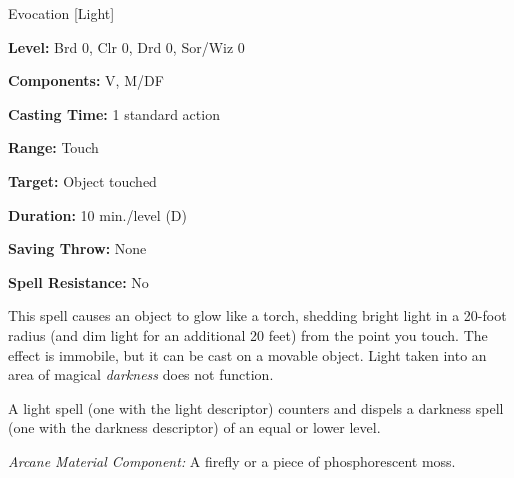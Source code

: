 
Evocation [Light]

\textbf{Level:} Brd 0, Clr 0, Drd 0, Sor/Wiz 0

\textbf{Components:} V, M/DF

\textbf{Casting Time:} 1 standard action

\textbf{Range:} Touch

\textbf{Target:} Object touched

\textbf{Duration:} 10 min./level (D)

\textbf{Saving Throw:} None

\textbf{Spell Resistance:} No

This spell causes an object to glow like a torch, shedding bright light in a 20-foot 
radius (and dim light for an additional 20 feet) from the point you touch. The 
effect is immobile, but it can be cast on a movable object. Light taken into an 
area of magical \textit{darkness} does not function.

A light spell (one with the light descriptor) counters and dispels a darkness spell 
(one with the darkness descriptor) of an equal or lower level.

\textit{Arcane Material Component:} A firefly or a piece of phosphorescent moss.

